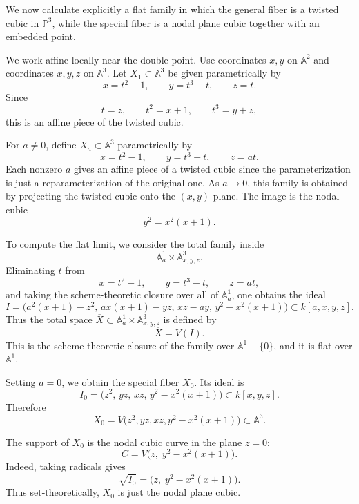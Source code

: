 \documentclass[12pt]{article}
\begin{document}
\begin{example}
    We now calculate explicitly a flat family in which the general fiber is a twisted cubic in $\mathbb P^3$, while the special fiber is a nodal plane cubic together with an embedded point.

    We work affine-locally near the double point. Use coordinates $x,y$ on $\mathbb A^2$ and coordinates $x,y,z$ on $\mathbb A^3$. Let $X_1\subset \mathbb A^3$ be given parametrically by
    \[
        x=t^2-1,\qquad
        y=t^3-t,\qquad
        z=t.
    \]
    Since
    \[
        t=z,\qquad
        t^2=x+1,\qquad
        t^3=y+z,
    \]
    this is an affine piece of the twisted cubic.

    For $a\neq 0$, define $X_a\subset \mathbb A^3$ parametrically by
    \[
        x=t^2-1,\qquad
        y=t^3-t,\qquad
        z=at.
    \]
    Each nonzero $a$ gives an affine piece of a twisted cubic since the parameterization is just a reparameterization of the original one.
    As $a\to 0$, this family is obtained by projecting the twisted cubic onto the $(x,y)$-plane. The image is the nodal cubic
    \[
        y^2=x^2(x+1).
    \]

    To compute the flat limit, we consider the total family inside
    \[
        \mathbb A^1_a\times \mathbb A^3_{x,y,z}.
    \]
    Eliminating $t$ from
    \[
        x=t^2-1,\qquad
        y=t^3-t,\qquad
        z=at,
    \]
    and taking the scheme-theoretic closure over all of $\mathbb A^1_a$, one obtains the ideal
    \[
        I=
        \bigl(
        a^2(x+1)-z^2,\,
        ax(x+1)-yz,\,
        xz-ay,\,
        y^2-x^2(x+1)
        \bigr)
        \subset k[a,x,y,z].
    \]
    Thus the total space $\overline X\subset \mathbb A^1_a\times \mathbb A^3_{x,y,z}$ is defined by
    \[
        \overline X=V(I).
    \]
    This is the scheme-theoretic closure of the family over $\mathbb A^1-\{0\}$, and it is flat over $\mathbb A^1$.

    Setting $a=0$, we obtain the special fiber $X_0$. Its ideal is
    \[
        I_0=
        \bigl(
        z^2,\,
        yz,\,
        xz,\,
        y^2-x^2(x+1)
        \bigr)
        \subset k[x,y,z].
    \]
    Therefore
    \[
        X_0
        =
        V\bigl(z^2,yz,xz,y^2-x^2(x+1)\bigr)
        \subset \mathbb A^3.
    \]

    The support of $X_0$ is the nodal cubic curve in the plane $z=0$:
    \[
        C=V\bigl(z,\; y^2-x^2(x+1)\bigr).
    \]
    Indeed, taking radicals gives
    \[
        \sqrt{I_0}
        =
        \bigl(z,\; y^2-x^2(x+1)\bigr).
    \]
    Thus set-theoretically, $X_0$ is just the nodal plane cubic.


\end{example}
\end{document}
